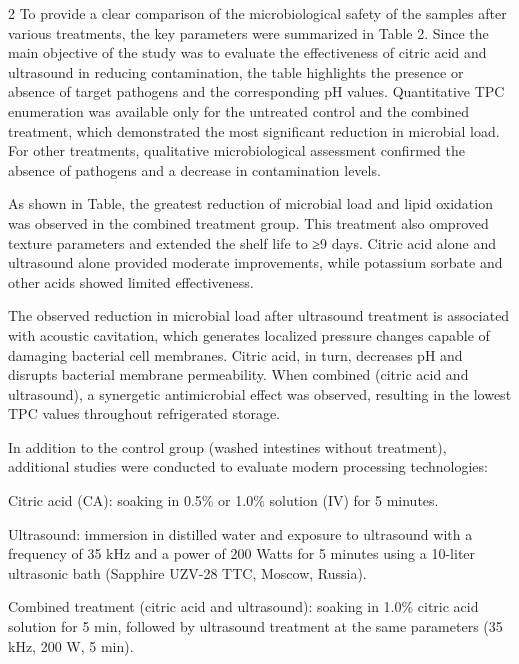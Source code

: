 \begin{multicols}{2}
To provide a clear comparison of the microbiological safety of the
samples after various treatments, the key parameters were summarized in
Table 2. Since the main objective of the study was to evaluate the
effectiveness of citric acid and ultrasound in reducing contamination,
the table highlights the presence or absence of target pathogens and the
corresponding pH values. Quantitative TPC enumeration was available only
for the untreated control and the combined treatment, which demonstrated
the most significant reduction in microbial load. For other treatments,
qualitative microbiological assessment confirmed the absence of
pathogens and a decrease in contamination levels.

As shown in Table, the greatest reduction of microbial load and lipid
oxidation was observed in the combined treatment group. This treatment
also omproved texture parameters and extended the shelf life to ≥9 days.
Citric acid alone and ultrasound alone provided moderate improvements,
while potassium sorbate and other acids showed limited effectiveness.

The observed reduction in microbial load after ultrasound treatment is
associated with acoustic cavitation, which generates localized pressure
changes capable of damaging bacterial cell membranes. Citric acid, in
turn, decreases pH and disrupts bacterial membrane permeability. When
combined (citric acid and ultrasound), a synergetic antimicrobial effect
was observed, resulting in the lowest TPC values throughout refrigerated
storage.

In addition to the control group (washed intestines without treatment),
additional studies were conducted to evaluate modern processing
technologies:

Citric acid (CA): soaking in 0.5\% or 1.0\% solution (IV) for 5 minutes.

Ultrasound: immersion in distilled water and exposure to ultrasound with
a frequency of 35 kHz and a power of 200 Watts for 5 minutes using a
10-liter ultrasonic bath (Sapphire UZV-28 TTC, Moscow, Russia).

Combined treatment (citric acid and ultrasound): soaking in 1.0\% citric
acid solution for 5 min, followed by ultrasound treatment at the same
parameters (35 kHz, 200 W, 5 min).
\end{multicols}

